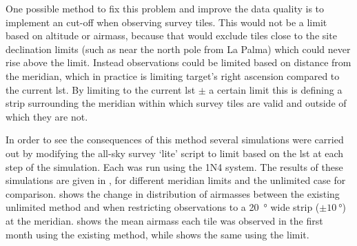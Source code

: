 \begin{colsection}
\begin{colsection}
One possible method to fix this problem and improve the data quality  is to implement an cut-off when observing survey tiles. This would not be a limit based on altitude or airmass, because that would exclude tiles close to the site declination limits (such as near the north pole from La Palma) which could never rise above the limit. Instead observations could be limited based on distance from the meridian, which in practice is limiting target's right ascension compared to the current \gls{lst}. By limiting to the current \gls{lst} $\pm$ a certain limit this is defining a strip surrounding the meridian within which survey tiles are valid and outside of which they are not.

In order to see the consequences of this method several simulations were carried out by modifying the all-sky survey `lite' script to limit based on the \gls{lst} at each step of the simulation. Each was run using the 1N4 system. The results of these simulations are given in , for different meridian limits and the unlimited case for comparison.  shows the change in distribution of airmasses between the existing unlimited method and when restricting observations to a \SI{20}{\degree} wide strip ($\pm\SI{10}{\degree}$) at the meridian.  shows the mean airmass each tile was observed in the first month using the existing method, while  shows the same using the limit.


\end{colsection}
\end{colsection}
